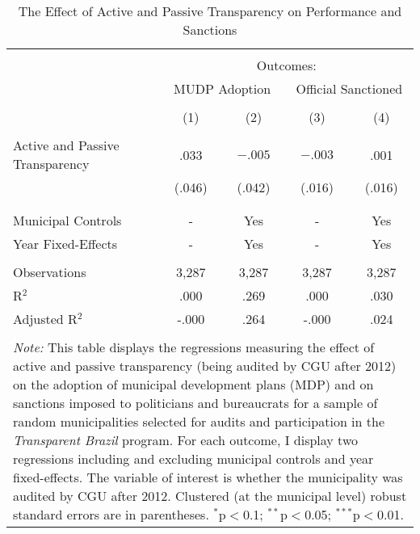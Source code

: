 
\begin{table}[!htbp] \centering
  \caption{The Effect of Active and Passive Transparency on Performance and Sanctions}
  \label{tab:performance3}
\scriptsize
\begin{tabular}{@{\extracolsep{.5cm}}lcccc}
\\[-1.8ex]\hline
\hline \\[-1.8ex]
& \multicolumn{4}{c}{Outcomes:} \T \B \\
\cline{2-5}
 & \multicolumn{2}{c}{MUDP Adoption} & \multicolumn{2}{c}{Official Sanctioned} \T \B \\
\\[-1.8ex] & \multicolumn{1}{c}{(1)} & \multicolumn{1}{c}{(2)} & \multicolumn{1}{c}{(3)} & \multicolumn{1}{c}{(4)}\\
\hline \\[-1.8ex]
Active and Passive Transparency & .033 & $-.005$ & $-.003$ & .001 \\
                                & (.046) & (.042) & (.016) & (.016) \\
                                & & & & \\
\hline \\[-1.8ex]
Municipal Controls & \multicolumn{1}{c}{-} & \multicolumn{1}{c}{Yes} & \multicolumn{1}{c}{-} & \multicolumn{1}{c}{Yes} \\
Year Fixed-Effects & \multicolumn{1}{c}{-} & \multicolumn{1}{c}{Yes} & \multicolumn{1}{c}{-} & \multicolumn{1}{c}{Yes} \\
\hline \\[-1.8ex]
Observations & \multicolumn{1}{c}{3,287} & \multicolumn{1}{c}{3,287} & \multicolumn{1}{c}{3,287} & \multicolumn{1}{c}{3,287} \\
R$^{2}$ & \multicolumn{1}{c}{.000} & \multicolumn{1}{c}{.269} & \multicolumn{1}{c}{.000} & \multicolumn{1}{c}{.030} \\
Adjusted R$^{2}$ & \multicolumn{1}{c}{-.000} & \multicolumn{1}{c}{.264} & \multicolumn{1}{c}{-.000} & \multicolumn{1}{c}{.024} \\
\hline
\hline \\[-1.8ex]
\multicolumn{5}{p{.65\textwidth}}{\emph{Note:} This table displays the regressions measuring the effect of active and passive transparency (being audited by CGU after 2012) on the adoption of municipal development plans (MDP) and on sanctions imposed to politicians and bureaucrats for a sample of random municipalities selected for audits and participation in the \emph{Transparent Brazil} program. For each outcome, I display two regressions including and excluding municipal controls and year fixed-effects. The variable of interest is whether the municipality was audited by CGU after 2012. Clustered (at the municipal level) robust standard errors are in parentheses. $^{*}$p$<$0.1; $^{**}$p$<$0.05; $^{***}$p$<$0.01.}
\end{tabular}
\end{table}
